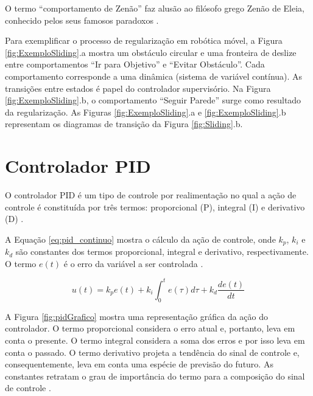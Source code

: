 

O termo ``comportamento de Zenão'' faz alusão ao filósofo grego Zenão de
Eleia, conhecido pelos seus famosos paradoxos \cite{art:Magnus_Behavior}.

Para exemplificar o processo de regularização em robótica móvel, a Figura 
\ref{fig:ExemploSliding}.a mostra um obstáculo circular e uma fronteira de 
deslize entre comportamentos ``Ir para Objetivo'' e ``Evitar Obstáculo''. 
Cada comportamento corresponde a uma dinâmica (sistema de variável contínua). 
As transições entre estados é papel do controlador supervisório. Na Figura 
\ref{fig:ExemploSliding}.b, o comportamento ``Seguir Parede'' surge como resultado
da regularização. As Figuras \ref{fig:ExemploSliding}.a e \ref{fig:ExemploSliding}.b 
representam os diagramas de transição da Figura \ref{fig:Sliding}.b.



\section{Controlador PID}

O controlador PID é um tipo de controle por realimentação no qual a ação de 
controle é constituída por três termos: proporcional (P), integral (I) e 
derivativo (D) \cite{LivroControlePID}.

A Equação \ref{eq:pid_continuo} mostra o cálculo da ação de controle, onde $k_p$, $k_i$ e $k_d$
são constantes dos termos proporcional, integral e derivativo, respectivamente. O termo $e(t)$
é o erro da variável a ser controlada \cite{LivroControlePID}.   

\begin{equation}
	\label{eq:pid_continuo}	
	u(t) = k_p e(t) + k_i \int_0^t e(\tau) d\tau + k_d \frac{de(t)}{dt}
\end{equation}

A Figura \ref{fig:pidGrafico} mostra uma representação gráfica da ação do controlador. O termo
proporcional considera o erro atual e, portanto, leva em conta o presente. O termo integral 
considera a soma dos erros e por isso leva em conta o passado. O termo derivativo projeta a tendência
do sinal de controle e, consequentemente, leva em conta uma espécie de previsão do futuro. As 
constantes retratam o grau de importância do termo para a composição do sinal de 
controle \cite{LivroControlePID}.

